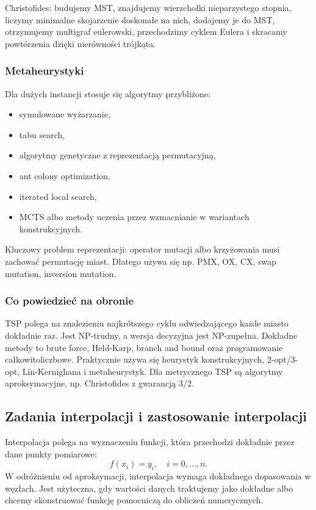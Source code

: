 Christofides: budujemy MST, znajdujemy wierzchołki nieparzystego stopnia, liczymy minimalne skojarzenie doskonałe na nich, dodajemy je do MST, otrzymujemy multigraf eulerowski, przechodzimy cyklem Eulera i skracamy powtórzenia dzięki nierówności trójkąta.

\subsubsection{Metaheurystyki}

Dla dużych instancji stosuje się algorytmy przybliżone:
\begin{itemize}
  \item symulowane wyżarzanie,
  \item tabu search,
  \item algorytmy genetyczne z reprezentacją permutacyjną,
  \item ant colony optimization,
  \item iterated local search,
  \item MCTS albo metody uczenia przez wzmacnianie w wariantach konstrukcyjnych.
\end{itemize}

Kluczowy problem reprezentacji: operator mutacji albo krzyżowania musi zachować permutację miast. Dlatego używa się np. PMX, OX, CX, swap mutation, inversion mutation.

\subsubsection{Co powiedzieć na obronie}

TSP polega na znalezieniu najkrótszego cyklu odwiedzającego każde miasto dokładnie raz. Jest NP-trudny, a wersja decyzyjna jest NP-zupełna. Dokładne metody to brute force, Held-Karp, branch and bound oraz programowanie całkowitoliczbowe. Praktycznie używa się heurystyk konstrukcyjnych, 2-opt/3-opt, Lin-Kernighana i metaheurystyk. Dla metrycznego TSP są algorytmy aproksymacyjne, np. Christofides z gwarancją $3/2$.

\subsection{Zadania interpolacji i zastosowanie interpolacji}

Interpolacja polega na wyznaczeniu funkcji, która przechodzi dokładnie przez dane punkty pomiarowe:
\[
f(x_i)=y_i,\quad i=0,\dots,n.
\]
W odróżnieniu od aproksymacji, interpolacja wymaga dokładnego dopasowania w węzłach. Jest użyteczna, gdy wartości danych traktujemy jako dokładne albo chcemy skonstruować funkcję pomocniczą do obliczeń numerycznych.

